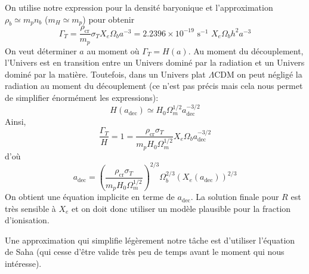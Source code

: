 \documentclass{article}
\numberwithin{equation}{section}
\begin{document}
On utilise notre expression pour la densité baryonique et 
l'approximation $\rho_b \simeq m_p n_b$ ($m_H \simeq m_p$) pour 
obtenir
\[
        \Gamma_T = %
        \frac{\rho_{\text{cr}}}{m_p} \sigma_T
        X_e \Omega_b a^{-3} 
        = 2.2396\times 10^{-19}\,\,\text{s}^{-1} \,\,X_e \Omega_b h^2 a^{-3}
\]
On veut déterminer $a$ au moment où $\Gamma_T = H(a)$. Au moment 
du découplement,
l'Univers est en transition entre un 
Univers dominé par la radiation et un Univers dominé par la 
matière. 
Toutefois, dans un Univers plat $\Lambda \text{CDM}$ on 
peut négligé la radiation au moment du découplement (ce n'est 
pas précis mais cela nous permet de simplifier énormément les expressions): 
\[
        H(a_{\text{dec}}) \simeq H_0  \Omega_m^{1/2} a_{\text{dec}}^{-3/2}
\]
Ainsi,
\[
        \frac{\Gamma_T}{H} = 1 = 
        \frac{\rho_{\text{cr}} \sigma_T}{m_p H_0 \Omega_m^{1/2}}
        X_e \Omega_b a_{\text{dec}}^{-3/2}
\]
d'où
\begin{equation}\label{eq:adec} 
        a_{\text{dec}} = 
        \left( \frac{\rho_{\text{cr}} \sigma_T}{m_p H_0 \Omega_m^{1/2}} \right)^{2/3}
        \Omega_b^{2/3}(X_e(a_{\text{dec}}))^{2/3}
\end{equation} 
On obtient une équation implicite en terme de $a_{\text{dec}}$. La solution 
finale pour $R$ est très sensible à $X_e$ et on doit donc utiliser un modèle 
plausible pour la fraction d'ionisation.

Une approximation qui simplifie légèrement notre tâche est d'utiliser 
l'équation de Saha (qui cesse d'être valide très peu de temps 
avant le moment qui nous intéresse). 
\end{document}
